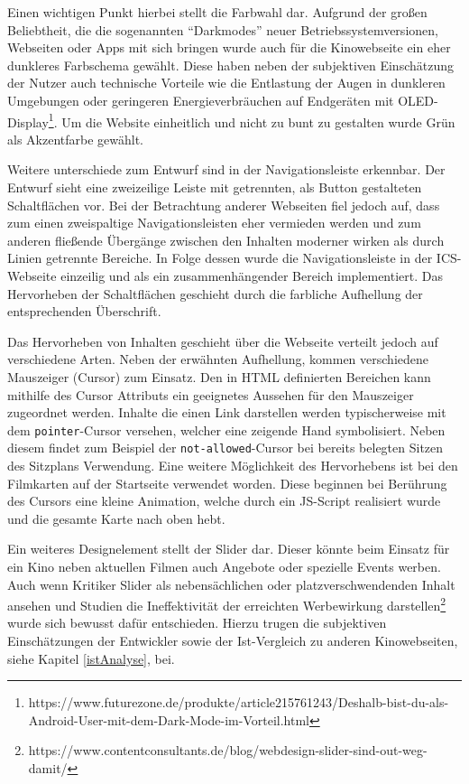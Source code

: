 	
	Einen wichtigen Punkt hierbei stellt die Farbwahl dar. Aufgrund der großen Beliebtheit, die die sogenannten \enquote{Darkmodes} neuer Betriebssystemversionen, Webseiten oder Apps mit sich bringen wurde auch für die Kinowebseite ein eher dunkleres Farbschema gewählt. Diese haben neben der subjektiven Einschätzung der Nutzer auch technische Vorteile wie die Entlastung der Augen in dunkleren Umgebungen oder geringeren Energieverbräuchen auf Endgeräten mit OLED-Display\footnote{https://www.futurezone.de/produkte/article215761243/Deshalb-bist-du-als-Android-User-mit-dem-Dark-Mode-im-Vorteil.html}. Um die Website einheitlich und nicht zu bunt zu gestalten wurde Grün als Akzentfarbe gewählt.
	
	
	Weitere unterschiede zum Entwurf sind in der Navigationsleiste erkennbar. Der Entwurf sieht eine zweizeilige Leiste mit getrennten, als Button gestalteten Schaltflächen vor. Bei der Betrachtung anderer Webseiten fiel jedoch auf, dass zum einen zweispaltige Navigationsleisten eher vermieden werden und zum anderen fließende Übergänge zwischen den Inhalten moderner wirken als durch Linien getrennte Bereiche. In Folge dessen wurde die Navigationsleiste in der \ac{ICS}-Webseite einzeilig und als ein zusammenhängender Bereich implementiert. Das Hervorheben der Schaltflächen geschieht durch die farbliche Aufhellung der entsprechenden Überschrift. 
	
	
	Das Hervorheben von Inhalten geschieht über die Webseite verteilt jedoch auf verschiedene Arten. Neben der erwähnten Aufhellung, kommen verschiedene Mauszeiger (Cursor) zum Einsatz. Den in \ac{HTML} definierten Bereichen kann mithilfe des Cursor Attributs ein geeignetes Aussehen für den Mauszeiger zugeordnet werden. Inhalte die einen Link darstellen werden typischerweise mit dem \texttt{pointer}-Cursor versehen, welcher eine zeigende Hand symbolisiert. Neben diesem findet zum Beispiel der \texttt{not-allowed}-Cursor bei bereits belegten Sitzen des Sitzplans Verwendung. Eine weitere Möglichkeit des Hervorhebens ist bei den Filmkarten auf der Startseite verwendet worden. Diese beginnen bei Berührung des Cursors eine kleine Animation, welche durch ein JS-Script realisiert wurde und die gesamte Karte nach oben hebt. 
	
	Ein weiteres Designelement stellt der Slider dar. Dieser könnte beim Einsatz für ein Kino neben aktuellen Filmen auch Angebote oder spezielle Events werben. Auch wenn Kritiker Slider als nebensächlichen oder platzverschwendenden Inhalt ansehen und Studien die Ineffektivität der erreichten Werbewirkung darstellen\footnote{https://www.contentconsultants.de/blog/webdesign-slider-sind-out-weg-damit/} wurde sich bewusst dafür entschieden. Hierzu trugen die subjektiven Einschätzungen der Entwickler sowie der Ist-Vergleich zu anderen Kinowebseiten, siehe Kapitel \vref{istAnalyse}, bei.
	
